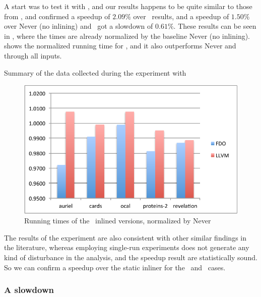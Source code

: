 A start was to test it with \gzip, and our results happens to be quite similar to those from \bzip, and confirmed a speedup of $2.09 \%$ over \llvm\ results, and a speedup of $1.50 \%$ over Never (no inlining) and \llvm\ got a slowdown of $0.61 \%$. These results can be seen in , where the times are already normalized by the baseline Never (no inlining).  shows the normalized running time for \gzip, and it also outperforms Never and \llvm through all inputs.

\begin{table}
  \centering
  \begin{tiny}
  
  \end{tiny}
  \caption{Summary of the data collected during the experiment with \gzip}
  \label{tab:speedupz}
\end{table}

\begin{figure}
  \centering
  \includegraphics[width=1.00\linewidth]{Figures/speedup}
  \caption{Running times of the \gzip\ inlined versions, normalized by Never}
  \label{fig:speedupz}
\end{figure}

The results of the experiment are also consistent with other similar findings in the literature, whereas employing single-run experiments does not generate any kind of disturbance in the analysis, and the speedup result are statistically sound. So we can confirm a speedup over the static inliner for the \bzip\ and \gzip\ cases.

\subsubsection{A slowdown}
\label{sec:slowdown}

